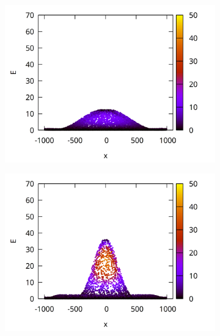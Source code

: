 \documentclass[11pt]{article}
\begin{document}
\begin{figure}
\centering
\begin{subfigure}{0.33\textwidth}
    \centering
    \includegraphics[width=1.\textwidth]{img/energy_70.png}
\end{subfigure}%
\begin{subfigure}{0.33\textwidth}
    \centering
    \includegraphics[width=1.\textwidth]{img/energy_120.png}


\end{subfigure}
\end{figure}
\end{document}
